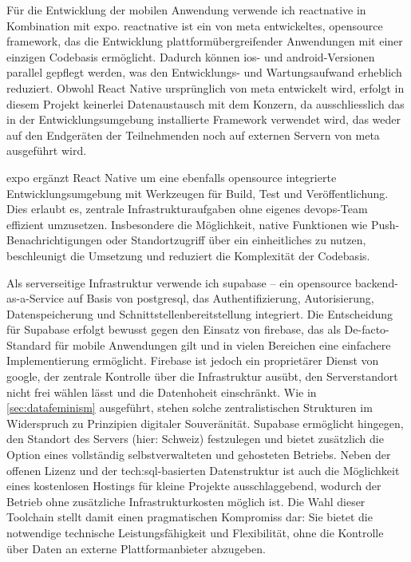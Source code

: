 Für die Entwicklung der mobilen Anwendung verwende ich \gls{reactnative} in Kombination mit \gls{expo}. \gls{reactnative} ist ein von \gls{meta} entwickeltes, \gls{opensource} \gls{framework}, das die Entwicklung plattformübergreifender Anwendungen mit einer einzigen Codebasis ermöglicht. Dadurch können \gls{ios}- und \gls{android}-Versionen parallel gepflegt werden, was den Entwicklungs- und Wartungsaufwand erheblich reduziert. Obwohl React Native ursprünglich von \gls{meta} entwickelt wird, erfolgt in diesem Projekt keinerlei Datenaustausch mit dem Konzern, da ausschliesslich das in der Entwicklungsumgebung installierte Framework verwendet wird, das weder auf den Endgeräten der Teilnehmenden noch auf externen Servern von \gls{meta} ausgeführt wird.

\gls{expo} ergänzt React Native um eine ebenfalls \gls{opensource} integrierte Entwicklungsumgebung mit Werkzeugen für Build, Test und Veröffentlichung. Dies erlaubt es, zentrale Infrastrukturaufgaben ohne eigenes \gls{devops}-Team effizient umzusetzen. Insbesondere die Möglichkeit, native Funktionen wie Push-Benachrichtigungen oder Standortzugriff über ein einheitliches  zu nutzen, beschleunigt die Umsetzung und reduziert die Komplexität der Codebasis.

Als serverseitige Infrastruktur verwende ich \gls{supabase} -- ein \gls{opensource} \gls{backend}-as-a-Service auf Basis von \gls{postgresql}, das Authentifizierung, Autorisierung, Datenspeicherung und Schnittstellenbereitstellung integriert. Die Entscheidung für Supabase erfolgt bewusst gegen den Einsatz von \gls{firebase}, das als De-facto-Standard für mobile Anwendungen gilt und in vielen Bereichen eine einfachere Implementierung ermöglicht. Firebase ist jedoch ein proprietärer Dienst von \gls{google}, der zentrale Kontrolle über die Infrastruktur ausübt, den Serverstandort nicht frei wählen lässt und die Datenhoheit einschränkt. Wie in \cref{sec:datafeminism} ausgeführt, stehen solche zentralistischen Strukturen im Widerspruch zu Prinzipien digitaler Souveränität. Supabase ermöglicht hingegen, den Standort des Servers (hier: Schweiz) festzulegen und bietet zusätzlich die Option eines vollständig selbstverwalteten und gehosteten Betriebs. Neben der offenen Lizenz und der \gls{tech:sql}-basierten Datenstruktur ist auch die Möglichkeit eines kostenlosen Hostings für kleine Projekte ausschlaggebend, wodurch der Betrieb ohne zusätzliche Infrastrukturkosten möglich ist. Die Wahl dieser Toolchain stellt damit einen pragmatischen Kompromiss dar: Sie bietet die notwendige technische Leistungsfähigkeit und Flexibilität, ohne die Kontrolle über Daten an externe Plattformanbieter abzugeben.

